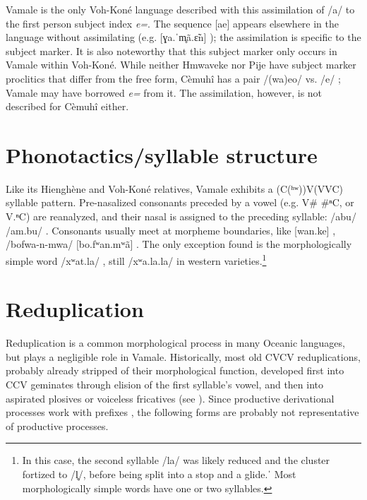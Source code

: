 	
	Vamale is the only Voh-Koné language described with this assimilation of /a/ to the first person subject index \textit{e=}. The sequence [ae] appears elsewhere in the language without assimilating (e.g. [ɣa.ˈm̥ã.ɛ̃n] ); the assimilation is specific to the subject marker. It is also noteworthy that this subject marker only occurs in Vamale within Voh-Koné. While neither Hmwaveke nor Pije \parencite[246, 247]{haudricourt_dictionnaire_1982} have subject marker proclitics that differ from the free form, Cèmuhî has a pair /(wa)eo/ vs. /e/ \parencite[61]{rivierre_langue_1980}; Vamale may have borrowed \textit{e=}  from it. The assimilation, however, is not described for Cèmuhî either.
	
	\section{Phonotactics/syllable structure}
	\begin{sloppypar}
	Like its Hienghène and Voh-Koné relatives, Vamale exhibits a (C(ʰʷ))V(VVC) syllable pattern. Pre-nasalized consonants preceded by a vowel (e.g. V\# \#ⁿC, or V.ⁿC) are reanalyzed, and their nasal is assigned to the preceding syllable: /abu/ /am.bu/ . %
	Consonants usually meet at morpheme boundaries, like [wan.ke] , /bofwa-n-mwa/ [bo.fʷan.mʷã] . The only exception found is the morphologically simple word /xʷat.la/ , still /xʷa.la.la/ in western varieties.\footnote{In this case, the second syllable /la/ was likely reduced and the cluster fortized to /l̥/, before being split into a stop and a glide.ˈ Most morphologically simple words have one or two syllables.}
	\end{sloppypar}
	
	\section{Reduplication}
	Reduplication is a common morphological process in many Oceanic languages, but plays a negligible role in Vamale. Historically, most old CVCV reduplications, probably already stripped of their morphological function, developed first into CCV geminates through elision of the first syllable's vowel, and then into aspirated plosives or voiceless fricatives (see ). Since productive derivational processes work with prefixes%
	, the following forms are probably not representative of productive processes.
	

